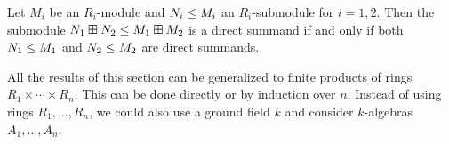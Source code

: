 \begin{corollary}
  \label{corollary: direct summands for modules over products}
  Let $M_i$ be an $R_i$-module and $N_i \leq M_i$ an $R_i$-submodule for $i = 1, 2$.
  Then the submodule $N_1 \boxplus N_2 \leq M_1 \boxplus M_2$ is a direct summand if and only if both $N_1 \leq M_1$ and $N_2 \leq M_2$ are direct summands.
\end{corollary}


\begin{remark}
  All the results of this section can be generalized to finite products of rings $R_1 \times \dotsb \times R_n$.
  This can be done directly or by induction over $n$.
  Instead of using rings $R_1, \dotsc, R_n$, we could also use a ground field $k$ and consider $k$-algebras $A_1, \dotsc, A_n$.
\end{remark}


